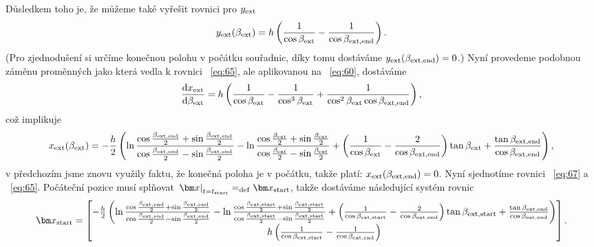 \documentclass[reqno, a4paper]{amsart}
\begin{document}
Důsledkem toho je, že můžeme také vyřešit rovnici pro $y_{\mathrm{ext}}$
\begin{equation}
  \label{eq:65}
  y_{\mathrm{ext}}(\beta_{\mathrm{ext}})
  =
  h
  \left(
    \frac{1}{\cos \beta_{\mathrm{ext}}}
    -
    \frac{1}{\cos \beta_{\mathrm{ext}, \mathrm{end}}}
  \right)
  .
\end{equation}
(Pro zjednodušení si určíme konečnou polohu v počátku souřadnic, díky tomu dostáváme $y_{\mathrm{ext}}(\beta_{\mathrm{ext}, \mathrm{end}}) = 0$.)
Nyní provedeme podobnou záměnu proměnných jako která vedla k rovnici ~\eqref{eq:65}, ale aplikovanou na ~\eqref{eq:60}, dostáváme
\begin{equation}
  \label{eq:66}
  \frac{\mathrm{d} {x_{\mathrm{ext}}}}{\mathrm{d} {\beta_{\mathrm{ext}}}}
  =
  h
  \left(
    \frac{1}{\cos \beta_{\mathrm{ext}}}
    -
    \frac{1}{\cos^3 \beta_{\mathrm{ext}}}
    +
    \frac{1}{\cos^2 \beta_{\mathrm{ext}} \cos \beta_{\mathrm{ext}, \mathrm{end}}}
  \right)
  ,
\end{equation}
což implikuje
\begin{equation}
  \label{eq:67}
  x_{\mathrm{ext}}(\beta_{\mathrm{ext}})
  =
-
  \frac{h}{2}
  \left(
    \ln
    \frac{\cos \frac{\beta_{\mathrm{ext}, \mathrm{end}}}{2} + \sin \frac{\beta_{\mathrm{ext}, \mathrm{end}}}{2}}{\cos \frac{\beta_{\mathrm{ext}, \mathrm{end}}}{2} - \sin \frac{\beta_{\mathrm{ext}, \mathrm{end}}}{2}}
-
    \ln
    \frac{\cos \frac{\beta_{\mathrm{ext}}}{2} + \sin \frac{\beta_{\mathrm{ext}}}{2}}{\cos \frac{\beta_{\mathrm{ext}}}{2} - \sin \frac{\beta_{\mathrm{ext}}}{2}}
    +
    \left(
      \frac{1}{\cos \beta_{\mathrm{ext}}}
      -
      \frac{2}{\cos \beta_{\mathrm{ext}, \mathrm{end}}}
    \right)
    \tan\beta_{\mathrm{ext}}
+
 \frac{ \tan\beta_{\mathrm{ext}, \mathrm{end}}}{\cos \beta_{\mathrm{ext}, \mathrm{end}}}
  \right)
  ,
\end{equation}
v předchozím jsme znovu využily faktu, že konečná poloha je v počátku, takže platí: $x_{\mathrm{ext}}(\beta_{\mathrm{ext}, \mathrm{end}}) = 0$. Nyní sjednotíme rovnici ~\eqref{eq:67} a ~\eqref{eq:65}. Počáteční pozice musí splňovat $ \left. \vec{x} \right|_{t=t_\navstart} = _{\bydefinition} \vec{x}_{\navstart}$, takže dostáváme následující systém rovnic
\begin{equation}
  \label{eq:68}
  \vec{x}_{\navstart}
  =
  \begin{bmatrix}
 -
  \frac{h}{2}
  \left(
    \ln
    \frac{\cos \frac{\beta_{\navext, \navend}}{2} + \sin \frac{\beta_{\navext, \navend}}{2}}{\cos \frac{\beta_{\navext, \navend}}{2} - \sin \frac{\beta_{\navext, \navend}}{2}}
-
    \ln
    \frac{\cos \frac{\beta_{\navext, \navstart}}{2} + \sin \frac{\beta_{\navext, \navstart}}{2}}{\cos \frac{\beta_{\navext, \navstart}}{2} - \sin \frac{\beta_{\navext, \navstart}}{2}}
    +
    \left(
      \frac{1}{\cos \beta_{\navext, \navstart}}
      -
      \frac{2}{\cos \beta_{\navext, \navend}}
    \right)
    \tan\beta_{\navext, \navstart}
+
 \frac{ \tan\beta_{\navext, \navend}}{\cos \beta_{\navext, \navend}}
\right)
\\
    h
  \left(
    \frac{1}{\cos \beta_{\navext, \navstart}}
    -
    \frac{1}{\cos \beta_{\navext, \navend}}
  \right)
\end{bmatrix}
.
\end{equation}
\end{document}
